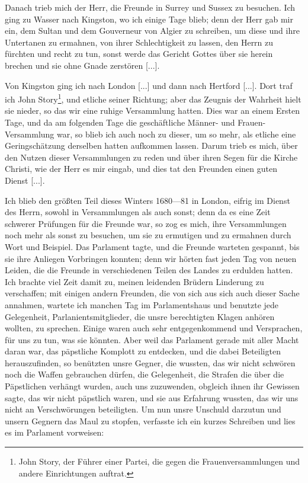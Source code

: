 Danach trieb mich der Herr, die Freunde in Surrey und
Sussex zu besuchen. Ich ging zu Wasser nach Kingston, wo ich
einige Tage blieb; denn der Herr gab mir ein, dem Sultan
und dem Gouverneur von Algier zu schreiben, um diese und
ihre Untertanen zu ermahnen, von ihrer Schlechtigkeit zu
lassen, den Herrn zu fürchten und recht zu tun, sonst werde
das Gericht Gottes über sie herein 
brechen und sie ohne Gnade zerstören [...].

Von Kingston ging ich nach London [...] und dann nach
Hertford [...]. Dort traf ich John 
Story\footnote{John Story, der Führer einer Partei, 
die gegen die Frauenversammlungen und andere Einrichtungen 
auftrat.}, und etliche seiner
Richtung; aber das Zeugnis der Wahrheit hielt sie nieder, so
das wir eine ruhige Versammlung hatten. Dies war an einem Ersten
Tage, und da am folgenden Tage die geschäftliche Männer- und
Frauen-Versammlung war, so blieb ich auch noch zu dieser, um
so mehr, als etliche eine Geringschätzung derselben hatten aufkommen
lassen. Darum trieb es mich, über den Nutzen dieser Versammlungen
zu reden und über ihren Segen für die Kirche Christi, wie der
Herr es mir eingab, und dies tat den Freunden einen guten
Dienst [...].

Ich blieb den größten Teil dieses Winters 1680—81 in London,
eifrig im Dienst des Herrn, sowohl in Versammlungen als auch
sonst; denn da es eine Zeit schwerer Prüfungen für die Freunde
war, so zog es mich, ihre Versammlungen noch mehr als sonst
zu besuchen, um sie zu ermutigen und zu ermahnen durch Wort
und Beispiel. Das Parlament tagte, und die Freunde warteten
gespannt, bis sie ihre Anliegen Vorbringen konnten; denn wir
hörten fast jeden Tag von neuen Leiden, die die Freunde in 
verschiedenen Teilen des Landes zu erdulden hatten. Ich brachte
viel Zeit damit zu, meinen leidenden Brüdern Linderung zu 
verschaffen; mit einigen andern Freunden, die von sich aus sich auch
dieser Sache annahmen, wartete ich manchen Tag im 
Parlamentshaus und benutzte jede Gelegenheit, Parlanientsmitglieder, die
unsre berechtigten Klagen anhören wollten, 
zu sprechen. Einige
waren auch sehr entgegenkommend und Versprachen, für uns zu
tun, was sie könnten. Aber weil das Parlament gerade mit
aller Macht daran war, das päpstliche Komplott zu entdecken,
und die dabei Beteiligten herauszufinden, so benützten unsre Gegner,
die wussten, das wir nicht schwören noch die Waffen gebrauchen
dürfen, die Gelegenheit, die Strafen die über die Päpstlichen 
verhängt wurden, auch uns zuzuwenden, obgleich ihnen ihr Gewissen
sagte, das wir nicht päpstlich waren, und sie aus Erfahrung
wussten, das wir uns nicht an Verschwörungen beteiligten. Um
nun unsre Unschuld darzutun und unsern Gegnern das Maul zu
stopfen, verfasste ich ein kurzes Schreiben und lies es im 
Parlament vorweisen:

